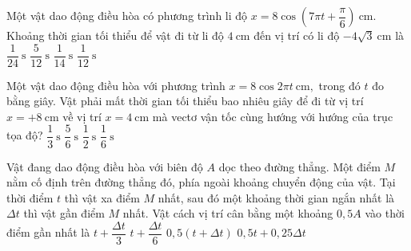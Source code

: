 \begin{ex}
Một vật dao động điều hòa có phương trình li độ
$x=8\cos\left(7\pi t+\dfrac{\pi}{6}\right)\ \text{cm}.$
Khoảng thời gian tối thiểu để vật đi từ li độ $4\ \text{cm}$ đến vị trí có li độ $-4\sqrt{3}\ \text{cm}$ là
\choice
{$\dfrac{1}{24}\ \text{s}$}
{$\dfrac{5}{12}\ \text{s}$}
{\True $\dfrac{1}{14}\ \text{s}$}
{$\dfrac{1}{12}\ \text{s}$}
\end{ex}

\begin{ex}
Một vật dao động điều hòa với phương trình
$x=8\cos 2\pi t\ \text{cm},$
trong đó $t$ đo bằng giây. Vật phải mất thời gian tối thiểu bao nhiêu giây để đi từ vị trí $x=+8\ \text{cm}$ về vị trí $x=4\ \text{cm}$ mà vectơ vận tốc cùng hướng với hướng của trục tọa độ?
\choice
{$\dfrac{1}{3}\ \text{s}$}
{\True $\dfrac{5}{6}\ \text{s}$}
{$\dfrac{1}{2}\ \text{s}$}
{$\dfrac{1}{6}\ \text{s}$}
\end{ex}

\begin{ex}
Vật đang dao động điều hòa với biên độ $A$ dọc theo đường thẳng. Một điểm $M$ nằm cố định trên đường thẳng đó, phía ngoài khoảng chuyển động của vật. Tại thời điểm $t$ thì vật xa điểm $M$ nhất, sau đó một khoảng thời gian ngắn nhất là $\Delta t$ thì vật gần điểm $M$ nhất. Vật cách vị trí cân bằng một khoảng $0,5A$ vào thời điểm gần nhất là
\choice
{\True $t+\dfrac{\Delta t}{3}$}
{$t+\dfrac{\Delta t}{6}$}
{$0,5(t+\Delta t)$}
{$0,5t+0,25\Delta t$}
\end{ex}

